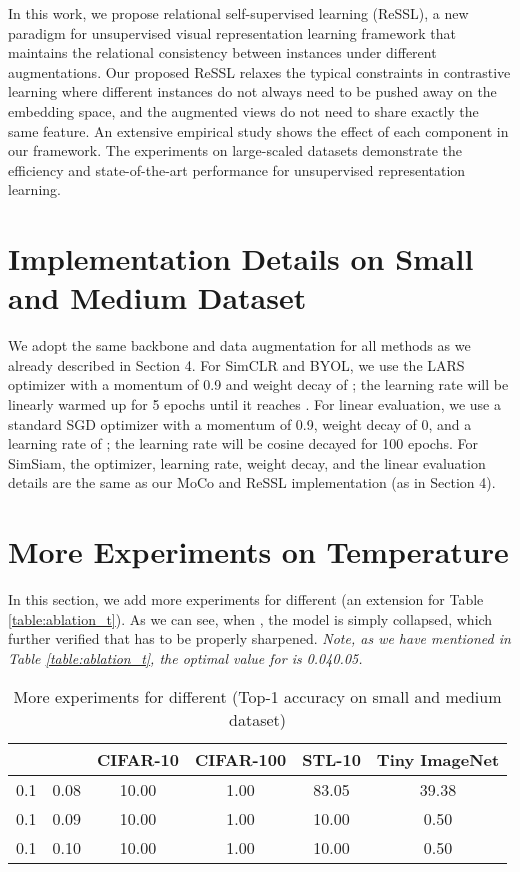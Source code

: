 \documentclass{article}
\newcommand{\<}{\left\langle}
\renewcommand{\>}{\right\rangle}
\begin{document}
In this work, we propose relational self-supervised learning (ReSSL), a new paradigm for unsupervised visual representation learning framework that maintains the relational consistency between instances under different augmentations. Our proposed ReSSL relaxes the typical constraints in contrastive learning where different instances do not always need to be pushed away on the embedding space, and the augmented views do not need to share exactly the same feature. An extensive empirical study shows the effect of each component in our framework. The experiments on large-scaled datasets demonstrate the efficiency and state-of-the-art performance for unsupervised representation learning. 
{\small


}





\newpage
\appendix
\section{Implementation Details on Small and Medium Dataset}
We adopt the same backbone and data augmentation for all methods as we already described in Section 4. For SimCLR and BYOL, we use the LARS optimizer with a momentum of 0.9 and weight decay of ; the learning rate will be linearly warmed up for 5 epochs until it reaches . For linear evaluation, we use a standard SGD optimizer with a momentum of 0.9, weight decay of 0, and a learning rate of ; the learning rate will be cosine decayed for 100 epochs. For SimSiam, the optimizer, learning rate, weight decay, and the linear evaluation details are the same as our MoCo and ReSSL implementation (as in Section 4).



\section{More Experiments on Temperature}
In this section, we add more experiments for different  (an extension for Table \ref{table:ablation_t}). As we can see, when , the model is simply collapsed, which further verified that  has to be properly sharpened. \emph{Note, as we have mentioned in Table \ref{table:ablation_t}, the optimal value for  is 0.040.05.}  

\renewcommand\arraystretch{1.12}
\begin{table}[h]
 \centering
 \setlength\tabcolsep{10pt}
 \small
 \caption{More experiments for different  (Top-1 accuracy on small and medium dataset)}
 \vspace{-5pt}
 \label{table:tau_t}
\begin{tabular}{c c c c c c} 
\toprule 
 &  & CIFAR-10 & CIFAR-100 & STL-10 & Tiny ImageNet \\ \hline
 0.1  & 0.08  & 10.00 & 1.00 & 83.05 & 39.38 \\
 0.1  & 0.09  & 10.00 & 1.00 & 10.00 & 0.50 \\
 0.1  & 0.10  & 10.00 & 1.00 & 10.00 & 0.50 \\
\toprule 
\end{tabular}
\end{table}
\end{document}
